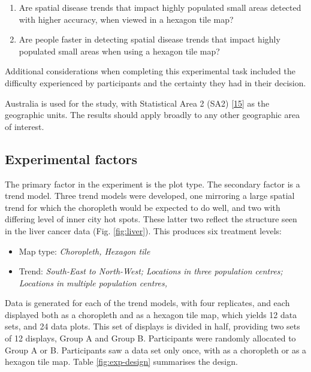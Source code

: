 \documentclass[conference,final,]{IEEEtran}
\providecommand{\tightlist}{%
  \setlength{\itemsep}{0pt}\setlength{\parskip}{0pt}}
\begin{document}
\begin{enumerate}
\def\labelenumi{\arabic{enumi}.}
\tightlist
\item
  Are spatial disease trends that impact highly populated small areas detected with higher accuracy, when viewed in a hexagon tile map?
\item
  Are people faster in detecting spatial disease trends that impact highly populated small areas when using a hexagon tile map?
\end{enumerate}

Additional considerations when completing this experimental task included the difficulty experienced by participants and the certainty they had in their decision.

Australia is used for the study, with Statistical Area 2 (SA2) {[}\protect\hyperlink{ref-abs2016}{15}{]} as the geographic units. The results should apply broadly to any other geographic area of interest.

\hypertarget{experimental-factors}{%
\subsection{Experimental factors}\label{experimental-factors}}

The primary factor in the experiment is the plot type. The secondary factor is a trend model. Three trend models were developed, one mirroring a large spatial trend for which the choropleth would be expected to do well, and two with differing level of inner city hot spots. These latter two reflect the structure seen in the liver cancer data (Fig. \ref{fig:liver}). This produces six treatment levels:

\begin{itemize}
\tightlist
\item
  Map type: \emph{Choropleth, Hexagon tile}
\item
  Trend: \emph{South-East to North-West; Locations in three population centres; Locations in multiple population centres, }
\end{itemize}

Data is generated for each of the trend models, with four replicates, and each displayed both as a choropleth and as a hexagon tile map, which yields 12 data sets, and 24 data plots. This set of displays is divided in half, providing two sets of 12 displays, Group A and Group B. Participants were randomly allocated to Group A or B. Participants saw a data set only once, with as a choropleth or as a hexagon tile map. Table \ref{fig:exp-design} summarises the design.
\end{document}

